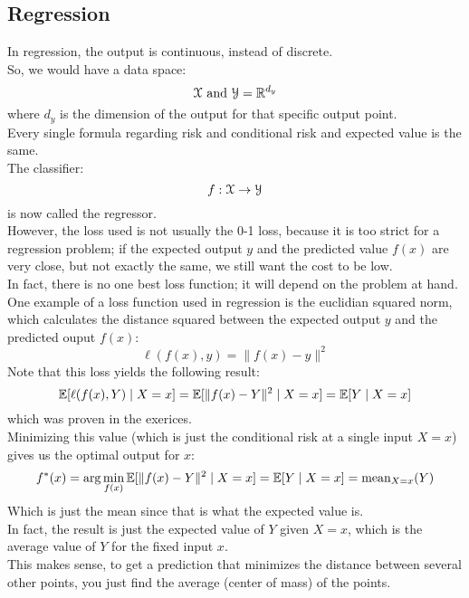 \documentclass[12pt]{article}
\begin{document}
\newpage

\subsection*{Regression}

In regression, the output is continuous,
instead of discrete. \\

So, we would have a data space:
\[ \mathcal{X}  \text{ and } \mathcal{Y} = \mathbb{R}^{d_y}\]
where $d_y$ is the dimension of
the output for that specific output point. \\

Every single formula regarding risk
and conditional risk and expected value
is the same. \\

The classifier:
\[ f: \mathcal{X} \to \mathcal{Y} \]
is now called the regressor. \\

However, the loss used is not usually
the 0-1 loss, because it is too strict
for a regression problem;
if the expected output $y$
and the predicted value $f(x)$
are very close, but not exactly the same,
we still want the cost to be low. \\

In fact, there is no one best loss function;
it will depend on the problem at hand. \\

One example of a loss function used in regression
is the euclidian squared norm,
which calculates the distance squared
between the expected output $y$
and the predicted ouput $f(x)$:
\[ \ell(f(x), y) = \|f(x) - y\|^2 \]
Note that this loss yields the following
result:
\[ \mathbb{E}[\ell(f(x), Y) \mid X = x]
= \mathbb{E}[\|f(x) - Y\|^2  \mid X = x]
= \mathbb{E}[Y \mid X = x] \]
which was proven in the exerices. \\
Minimizing this value (which is
just the conditional risk at a single
input $X = x$)
gives us the optimal output for $x$:
\[ f^*(x) = \arg\min_{f(x)}
\mathbb{E}[\|f(x) - Y\|^2  \mid X = x]
= \mathbb{E}[Y \mid X = x] = \text{mean}_{X=x}(Y) \]
Which is just the mean since that is
what the expected value is. \\

In fact, the result is just the expected
value of $Y$ given $X = x$,
which is the average value of $Y$
for the fixed input $x$. \\
This makes sense, to get a prediction that minimizes
the distance between several other points,
you just find the average (center of mass)
of the points. \\
\end{document}
